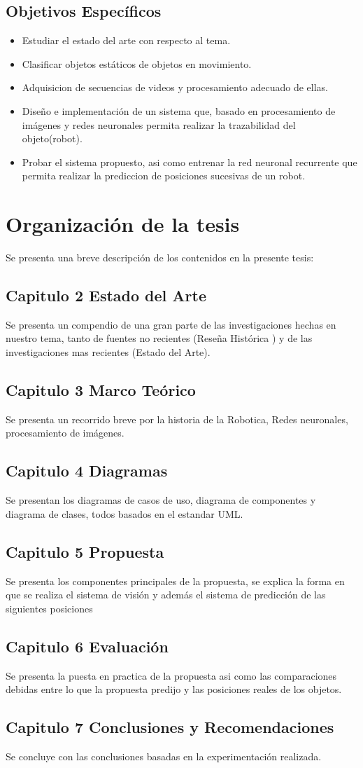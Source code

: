 \subsection{Objetivos Espec\'ificos}
\begin{itemize}
\item Estudiar el estado del arte con respecto al tema.
\item Clasificar objetos est\'aticos de objetos en movimiento.
\item Adquisicion de secuencias de videos y procesamiento adecuado de ellas.
\item Dise\~no e implementaci\'on de un sistema que, basado en procesamiento de im\'agenes y redes neuronales permita realizar la trazabilidad del objeto(robot).
\item Probar el sistema propuesto, asi como entrenar la red neuronal recurrente que permita realizar la prediccion de posiciones sucesivas de un robot.
\end{itemize}

\section{Organizaci\'on de la tesis}
Se presenta una breve descripci\'on  de los contenidos en la presente tesis:
\subsection{Capitulo 2 Estado del Arte}
Se presenta un compendio de una gran parte de las investigaciones hechas en nuestro tema, tanto de fuentes no recientes (Rese\~na Hist\'orica ) y de las investigaciones mas recientes (Estado del Arte).
\subsection{Capitulo 3 Marco Te\'orico}
Se presenta un recorrido breve por la historia de la Robotica, Redes neuronales, procesamiento de im\'agenes.
\subsection{Capitulo 4 Diagramas}
Se presentan los diagramas de casos de uso, diagrama de componentes y diagrama de clases, todos basados en el estandar UML.
\subsection{Capitulo 5 Propuesta}
Se presenta los componentes principales de la propuesta, se explica la forma en que se realiza el sistema de visi\'on y adem\'as el sistema de predicci\'on de las siguientes posiciones
\subsection{Capitulo 6 Evaluaci\'on}
Se presenta la puesta en practica de la propuesta asi como las comparaciones debidas entre lo que la propuesta predijo y las posiciones reales de los objetos.
\subsection{Capitulo 7 Conclusiones y Recomendaciones}
Se concluye con las conclusiones basadas en la experimentaci\'on realizada.